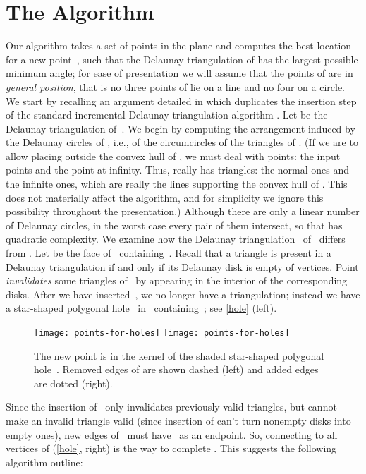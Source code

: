 \documentclass{cccg13}
\begin{document}
\section{The Algorithm}
Our algorithm takes a set  of  points in the plane and computes the best location for a new point~, such that the Delaunay triangulation of  has the largest possible minimum angle; for ease of presentation we will assume that the points of  are in \emph{general position}, that is no three points of  lie on a line and no four on a circle.  We start by recalling an argument detailed in \cite{orig} which duplicates the insertion step of the standard incremental Delaunay triangulation algorithm \cite{incremental}.  Let  be the Delaunay triangulation of~.  We begin by computing the arrangement  induced by the Delaunay circles of , i.e., of the circumcircles of the triangles of .  (If we are to allow placing  outside the convex hull of , we must deal with  points: the input points and the point at infinity.  Thus,  really has  triangles: the normal ones and the infinite ones, which are really the lines supporting the convex hull of .  This does not materially affect the algorithm, and for simplicity we ignore this possibility throughout the presentation.)  Although there are only a linear number of Delaunay circles, in the worst case every pair of them intersect, so that  has quadratic complexity.  We examine how the Delaunay triangulation~ of~ differs from .  Let  be the face of~ containing~.  Recall that a triangle is present in a Delaunay triangulation if and only if its Delaunay disk is empty of vertices.  Point  \emph{invalidates} some triangles of~ by appearing in the interior of the corresponding disks. After we have inserted~, we no longer have a triangulation; instead we have a star-shaped polygonal hole~ in~ containing~; see \autoref{hole} (left).
\begin{figure*}
\centering
\texttt{[image: points-for-holes]}\hfil
\texttt{[image: points-for-holes]}
\caption{\label{hole}The new point  is in the kernel of the shaded star-shaped polygonal hole~.  Removed edges of  are shown dashed (left) and added edges are dotted (right).}
\end{figure*}
Since the insertion of~ only invalidates previously valid triangles, but cannot make an invalid triangle valid (since insertion of  can't turn nonempty disks into empty ones), new edges of~ must have~ as an endpoint.  So, connecting  to all vertices of  (\autoref{hole}, right) is the way to complete .  This suggests the following algorithm outline:
\end{document}
